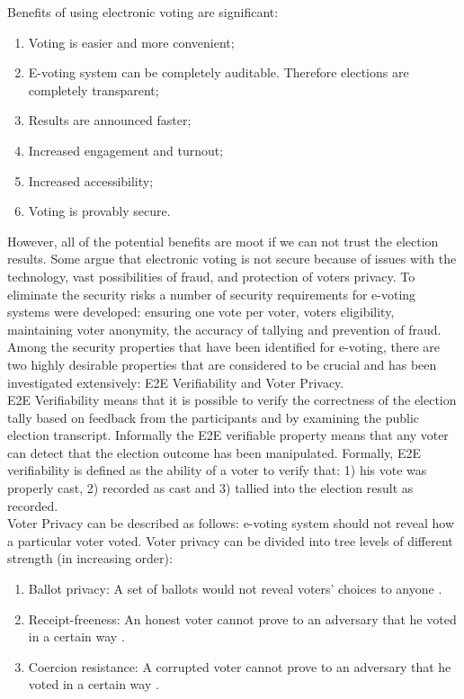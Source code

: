 Benefits of using electronic voting  are significant:
\begin{enumerate}
\item Voting is easier and more convenient;
\item E-voting system can be completely auditable. Therefore elections are completely transparent;
\item Results are announced faster;
\item Increased engagement and turnout; 
\item Increased accessibility;
\item Voting is provably secure.
 \end{enumerate}

However, all of the potential benefits are moot if we can not trust the election results. Some argue that electronic voting is not secure because of issues with the technology, vast possibilities of fraud, and protection of voters privacy.  To eliminate the security risks a number of security requirements for e-voting systems were developed: ensuring one vote per voter, voters eligibility, maintaining voter anonymity, the accuracy of tallying and prevention of fraud.\\
 
Among the security properties that have been identified for e-voting, there are two highly desirable properties that are considered to be crucial and has been investigated extensively: E2E Verifiability and Voter Privacy.\\

 E2E Verifiability means that it is possible to verify the correctness of the election tally based on feedback from the participants and by examining the public election transcript. Informally the E2E verifiable property means that any voter can detect that the election outcome has been manipulated.  Formally, E2E verifiability is defined as the ability of a voter  to verify that: 1) his vote was properly cast, 2) recorded as cast and 3) tallied into the election result as recorded. \\
 
 Voter Privacy can be described as follows: e-voting system should not reveal how a particular voter voted. Voter privacy can be divided into tree levels of different strength (in increasing order):
\begin{enumerate}
\item Ballot privacy: A set of ballots would not reveal  voters' choices to anyone \cite{Bernhard2015}. 
\item Receipt-freeness: An honest voter cannot prove to an adversary that he voted in a certain way \cite{Kremer}.
\item Coercion resistance: A corrupted voter cannot prove to an adversary that he voted in a certain way \cite{Delaune2006}.
\end{enumerate}

